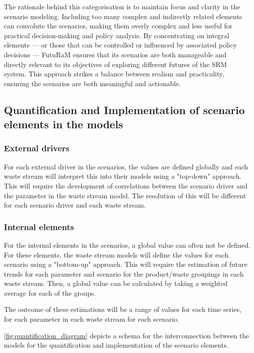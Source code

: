 The rationale behind this categorisation is to maintain focus and clarity in the scenario modeling. Including too many complex and indirectly related elements can convolute the scenarios, making them overly complex and less useful for practical decision-making and policy analysis. By concentrating on integral elements --- or those that can be controlled or influenced by associated policy decisions --- FutuRaM ensures that its scenarios are both manageable and directly relevant to its objectives of exploring different futures of the SRM system. This approach strikes a balance between realism and practicality, ensuring the scenarios are both meaningful and actionable.


\subsection{Quantification and Implementation of scenario elements in the models}

\subsubsection{External drivers}

For each external driver in the scenarios, the values are defined globally and each waste stream will interpret this into their models using a "top-down" approach. This will require the development of correlations between the scenario driver and the parameter in the waste stream model. The resolution of this will be different for each scenario driver and each waste stream. 

\subsubsection{Internal elements}

For the internal elements in the scenarios, a global value can often not be defined. For these elements, the waste stream models will define the values for each scenario using a "bottom-up" approach. This will require the estimation of future trends for each parameter and scenario for the product/waste groupings in each waste stream. Then, a global value can be calculated by taking a weighted average for each of the groups. 

The outcome of these estimations will be a range of values for each time series, for each parameter in each waste stream for each scenario.

\autoref{fig:quantification_diagram} depicts a schema for the interconnection between the models for the quantification and implementation of the scenario elements. 

